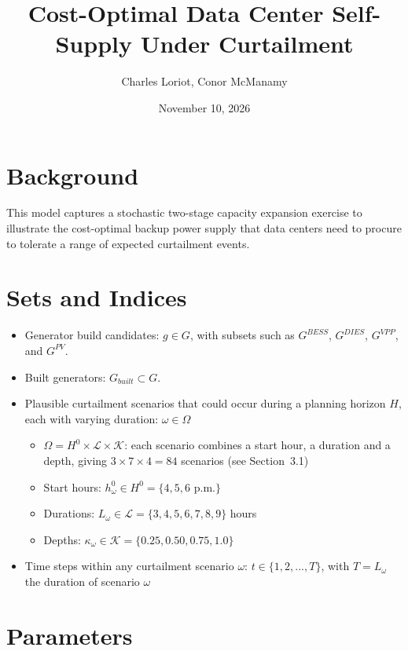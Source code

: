 \documentclass{article}
\title{Cost-Optimal Data Center Self-Supply Under Curtailment}
\author{Charles Loriot, Conor McManamy}
\date{November 10, 2026}
\begin{document}
\maketitle

\section{Background}

This model captures a stochastic two-stage capacity expansion exercise to illustrate the cost-optimal backup power supply that data centers need to procure to tolerate a range of expected curtailment events.

\section{Sets and Indices}

\begin{itemize}
    \item Generator build candidates: ${g \in G }$, with subsets such as $G^{BESS}$, $G^{DIES}$, $G^{VPP}$, and $G^{PV}$.
    \item Built generators: $G_{built} \subset G$.
    \item Plausible curtailment scenarios that could occur during a planning horizon $H$, each with varying duration: ${\omega \in {\Omega}}$
    \begin{itemize}
        \item $\Omega = H^{0} \times \mathcal{L} \times \mathcal{K}$: each scenario combines a start hour, a duration and a depth, giving $3 \times 7 \times 4 = 84$ scenarios (see Section~3.1) %
        \item Start hours: $h^{0}_\omega \in H^{0} = \{4, 5, 6 \text{ p.m.}\}$ %
        \item Durations: $L_\omega \in \mathcal{L} = \{3, 4, 5, 6, 7, 8, 9\}$ hours %
        \item Depths: $\kappa_\omega \in \mathcal{K} = \{0.25, 0.50, 0.75, 1.0\}$ %
    \end{itemize}
    \item Time steps within any curtailment scenario $\omega$: $t \in \{1,2, ..., {T}\}$, with $T = L_\omega$ the duration of scenario $\omega$ %
\end{itemize}


\section{Parameters}
\end{document}
